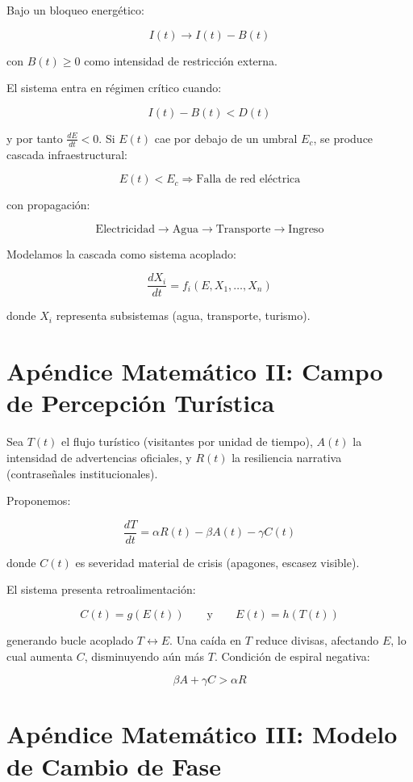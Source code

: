 \documentclass[12pt]{article}
\begin{document}
Bajo un bloqueo energético:

\[
I(t) \to I(t) - B(t)
\]

con \( B(t) \ge 0 \) como intensidad de restricción externa.

El sistema entra en régimen crítico cuando:

\[
I(t) - B(t) < D(t)
\]

y por tanto \( \frac{dE}{dt} < 0 \). Si \( E(t) \) cae por debajo de un umbral \( E_c \), se produce cascada infraestructural:

\[
E(t) < E_c \Rightarrow \text{Falla de red eléctrica}
\]

con propagación:

\[
\text{Electricidad} \to \text{Agua} \to \text{Transporte} \to \text{Ingreso}
\]

Modelamos la cascada como sistema acoplado:

\[
\frac{dX_i}{dt} = f_i(E, X_1, \dots, X_n)
\]

donde \( X_i \) representa subsistemas (agua, transporte, turismo).

\section{Apéndice Matemático II: Campo de Percepción Turística}

Sea \( T(t) \) el flujo turístico (visitantes por unidad de tiempo), \( A(t) \) la intensidad de advertencias oficiales, y \( R(t) \) la resiliencia narrativa (contraseñales institucionales).

Proponemos:

\[
\frac{dT}{dt} = \alpha R(t) - \beta A(t) - \gamma C(t)
\]

donde \( C(t) \) es severidad material de crisis (apagones, escasez visible).

El sistema presenta retroalimentación:

\[
C(t) = g(E(t)) \qquad \text{y} \qquad E(t) = h(T(t))
\]

generando bucle acoplado \( T \leftrightarrow E \). Una caída en \( T \) reduce divisas, afectando \( E \), lo cual aumenta \( C \), disminuyendo aún más \( T \). Condición de espiral negativa:

\[
\beta A + \gamma C > \alpha R
\]

\section{Apéndice Matemático III: Modelo de Cambio de Fase}
\end{document}
